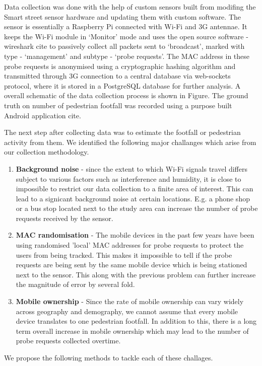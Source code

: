 Data collection was done with the help of custom sensors built from modifing the Smart street sensor \citep{sss2016} hardware and updating them with custom software.
The sensor is essentially a Raspberry Pi connected with Wi-Fi and 3G antennae.
It keeps the Wi-Fi module in `Monitor' mode and uses the open source software - wireshark cite to passively collect all packets sent to `broadcast', marked with type - `management' and subtype - `probe requests'.
The MAC address in these probe requests is anonymised using a cryptographic hashing algorithm and transmitted through 3G connection to a central database via web-sockets protocol, where it is stored in a PostgreSQL database for further analysis.
A overall schematic of the data collection process is shown in Figure.
The ground truth on number of pedestrian footfall was recorded using a purpose built Android application cite. 

The next step after collecting data was to estimate the footfall or pedestrian activity from them. We identified the following major challanges which arise from our collection methodology.
\begin{enumerate}
	\item \textbf{Background noise} - since the extent to which Wi-Fi signals travel differs subject to various factors such as interference and humidity, it is close to impossible to restrict our data collection to a finite area of interest. This can lead to a signicant background noise at certain locations. E.g. a phone shop or a bus stop located next to the study area can increase the number of probe requests received by the sensor.
	\item \textbf{MAC randomisation} - The mobile devices in the past few years have been using randomised 'local' MAC addresses for probe requests to protect the users from being tracked. This makes it impossible to tell if the probe requests are being sent by the same mobile device which is being stationed next to the sensor. This along with the previous problem can further increase the magnitude of error by several fold.
	\item \textbf{Mobile ownership} - Since the rate of mobile ownership can vary widely across geography and demography, we cannot assume that every mobile device translates to one pedestrian footfall. In addition to this, there is a long term overall increase in mobile ownership which may lead to the number of probe requests collected overtime. 
\end{enumerate}
We propose the following methods to tackle each of these challages.

